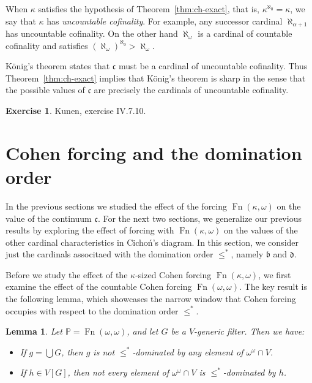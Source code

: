 \documentclass[11pt,oneside]{amsbook}
\newcommand{\PP}{\mathbb P}
\DeclareMathOperator{\Fn}{Fn}
\theoremstyle{definition}
\newtheorem{exercise}{Exercise}[section]
\theoremstyle{plain}
\newtheorem{lemma}[theorem]{Lemma}
\theoremstyle{definition}
\theoremstyle{remark}
\numberwithin{equation}{section}
\numberwithin{figure}{section}
\begin{document}
When $\kappa$ satisfies the hypothesis of Theorem~\ref{thm:ch-exact}, that is, $\kappa^{\aleph_0}=\kappa$, we say that $\kappa$ has \emph{uncountable cofinality}. For example, any successor cardinal $\aleph_{\alpha+1}$ has uncountable cofinality. On the other hand $\aleph_\omega$ is a cardinal of countable cofinality and satisfies $(\aleph_\omega)^{\aleph_0}>\aleph_\omega$.

K\"onig's theorem states that $\mathfrak c$ must be a cardinal of uncountable cofinality. Thus Theorem~\ref{thm:ch-exact} implies that K\"onig's theorem is sharp in the sense that the possible values of $\mathfrak c$ are precisely the cardinals of uncountable cofinality.

\begin{exercise}
  Kunen, exercise IV.7.10.
\end{exercise}


\newpage
\section{Cohen forcing and the domination order}

In the previous sections we studied the effect of the forcing $\Fn(\kappa,\omega)$ on the value of the continuum $\mathfrak c$. For the next two sections, we generalize our previous results by exploring the effect of forcing with $\Fn(\kappa,\omega)$ on the values of the other cardinal characteristics in Cicho\'n's diagram. In this section, we consider just the cardinals associtaed with the domination order $\leq^*$, namely $\mathfrak b$ and $\mathfrak d$.

Before we study the effect of the $\kappa$-sized Cohen forcing $\Fn(\kappa,\omega)$, we first examine the effect of the countable Cohen forcing $\Fn(\omega,\omega)$. The key result is the following lemma, which showcases the narrow window that Cohen forcing occupies with respect to the domination order $\leq^*$.

\begin{lemma}
  \label{lem:cohen-dominating}
  Let $\PP=\Fn(\omega,\omega)$, and let $G$ be a $V$-generic filter. Then we have:
  \begin{itemize}
  \item If $g=\bigcup G$, then $g$ is not $\leq^*$-dominated by any element of $\omega^\omega\cap V$.
  \item If $h\in V[G]$, then not every element of $\omega^\omega\cap V$ is $\leq^*$-dominated by $h$.
  \end{itemize}
\end{lemma}
\end{document}
